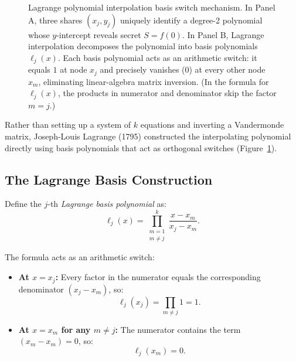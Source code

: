 \begin{figure}[H]
\caption{Lagrange polynomial interpolation basis switch mechanism. In Panel A, three shares $(x_j, y_j)$ uniquely identify a degree-2 polynomial whose $y$-intercept reveals secret $S = f(0)$. In Panel B, Lagrange interpolation decomposes the polynomial into basis polynomials $\ell_j(x)$. Each basis polynomial acts as an arithmetic switch: it equals $1$ at node $x_j$ and precisely vanishes ($0$) at every other node $x_m$, eliminating linear-algebra matrix inversion. (In the formula for $\ell_j(x)$, the products in numerator and denominator skip the factor $m = j$.)}
\label{ch40:fig-lagrange-basis}
\end{figure}

Rather than setting up a system of $k$ equations and inverting a Vandermonde matrix, Joseph-Louis
Lagrange (1795) constructed the interpolating polynomial directly using basis polynomials that act
as orthogonal switches (Figure~\ref{ch40:fig-lagrange-basis}).

\subsection{The Lagrange Basis Construction}

Define the $j$-th \emph{Lagrange basis polynomial} as:
\[
  \ell_j(x) = \prod_{\substack{m=1 \\ m \ne j}}^k \frac{x - x_m}{x_j - x_m}.
\]

The formula acts as an arithmetic switch:
\begin{itemize}
  \item \textbf{At $x = x_j$:} Every factor in the numerator equals the corresponding denominator
  $(x_j - x_m)$, so:
  \[
    \ell_j(x_j) = \prod_{m \ne j} 1 = 1.
  \]
  \item \textbf{At $x = x_m$ for any $m \ne j$:} The numerator contains the term $(x_m - x_m) = 0$, so:
  \[
    \ell_j(x_m) = 0.
  \]
\end{itemize}

